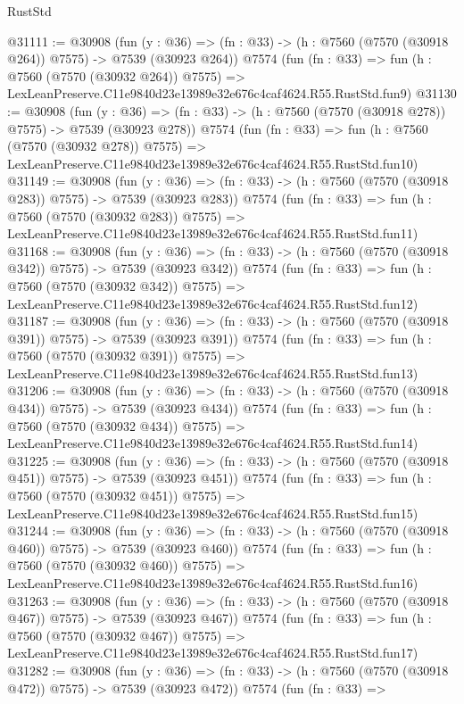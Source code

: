 \begin{lexlean}{RustStd}
\begin{coremodule}
@31111 := @30908
    (fun (y : @36) => (fn : @33) -> (h : @7560 (@7570 (@30918 @264)) @7575) -> @7539 (@30923 @264))
    @7574
    (fun (fn : @33) =>
    fun (h : @7560 (@7570 (@30932 @264)) @7575) =>
    LexLeanPreserve.C11e9840d23e13989e32e676c4caf4624.R55.RustStd.fun9)
@31130 := @30908
    (fun (y : @36) => (fn : @33) -> (h : @7560 (@7570 (@30918 @278)) @7575) -> @7539 (@30923 @278))
    @7574
    (fun (fn : @33) =>
    fun (h : @7560 (@7570 (@30932 @278)) @7575) =>
    LexLeanPreserve.C11e9840d23e13989e32e676c4caf4624.R55.RustStd.fun10)
@31149 := @30908
    (fun (y : @36) => (fn : @33) -> (h : @7560 (@7570 (@30918 @283)) @7575) -> @7539 (@30923 @283))
    @7574
    (fun (fn : @33) =>
    fun (h : @7560 (@7570 (@30932 @283)) @7575) =>
    LexLeanPreserve.C11e9840d23e13989e32e676c4caf4624.R55.RustStd.fun11)
@31168 := @30908
    (fun (y : @36) => (fn : @33) -> (h : @7560 (@7570 (@30918 @342)) @7575) -> @7539 (@30923 @342))
    @7574
    (fun (fn : @33) =>
    fun (h : @7560 (@7570 (@30932 @342)) @7575) =>
    LexLeanPreserve.C11e9840d23e13989e32e676c4caf4624.R55.RustStd.fun12)
@31187 := @30908
    (fun (y : @36) => (fn : @33) -> (h : @7560 (@7570 (@30918 @391)) @7575) -> @7539 (@30923 @391))
    @7574
    (fun (fn : @33) =>
    fun (h : @7560 (@7570 (@30932 @391)) @7575) =>
    LexLeanPreserve.C11e9840d23e13989e32e676c4caf4624.R55.RustStd.fun13)
@31206 := @30908
    (fun (y : @36) => (fn : @33) -> (h : @7560 (@7570 (@30918 @434)) @7575) -> @7539 (@30923 @434))
    @7574
    (fun (fn : @33) =>
    fun (h : @7560 (@7570 (@30932 @434)) @7575) =>
    LexLeanPreserve.C11e9840d23e13989e32e676c4caf4624.R55.RustStd.fun14)
@31225 := @30908
    (fun (y : @36) => (fn : @33) -> (h : @7560 (@7570 (@30918 @451)) @7575) -> @7539 (@30923 @451))
    @7574
    (fun (fn : @33) =>
    fun (h : @7560 (@7570 (@30932 @451)) @7575) =>
    LexLeanPreserve.C11e9840d23e13989e32e676c4caf4624.R55.RustStd.fun15)
@31244 := @30908
    (fun (y : @36) => (fn : @33) -> (h : @7560 (@7570 (@30918 @460)) @7575) -> @7539 (@30923 @460))
    @7574
    (fun (fn : @33) =>
    fun (h : @7560 (@7570 (@30932 @460)) @7575) =>
    LexLeanPreserve.C11e9840d23e13989e32e676c4caf4624.R55.RustStd.fun16)
@31263 := @30908
    (fun (y : @36) => (fn : @33) -> (h : @7560 (@7570 (@30918 @467)) @7575) -> @7539 (@30923 @467))
    @7574
    (fun (fn : @33) =>
    fun (h : @7560 (@7570 (@30932 @467)) @7575) =>
    LexLeanPreserve.C11e9840d23e13989e32e676c4caf4624.R55.RustStd.fun17)
@31282 := @30908
    (fun (y : @36) => (fn : @33) -> (h : @7560 (@7570 (@30918 @472)) @7575) -> @7539 (@30923 @472))
    @7574
    (fun (fn : @33) =>

\end{coremodule}
\end{lexlean}

